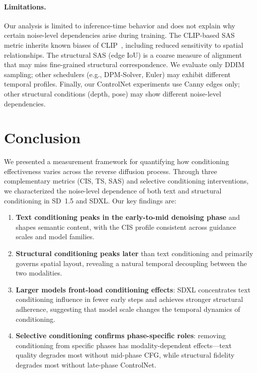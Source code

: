 \documentclass{article}
\begin{document}
\paragraph{Limitations.}
Our analysis is limited to inference-time behavior and does not explain why certain noise-level dependencies arise during training. The CLIP-based SAS metric inherits known biases of CLIP~\citep{radford2021learning}, including reduced sensitivity to spatial relationships. The structural SAS (edge IoU) is a coarse measure of alignment that may miss fine-grained structural correspondence. We evaluate only DDIM sampling; other schedulers (e.g., DPM-Solver, Euler) may exhibit different temporal profiles. Finally, our ControlNet experiments use Canny edges only; other structural conditions (depth, pose) may show different noise-level dependencies.

\section{Conclusion}
\label{sec:conclusion}

We presented a measurement framework for quantifying how conditioning effectiveness varies across the reverse diffusion process. Through three complementary metrics (CIS, TS, SAS) and selective conditioning interventions, we characterized the noise-level dependence of both text and structural conditioning in SD~1.5 and SDXL. Our key findings are:

\begin{enumerate}[nosep, leftmargin=*]
    \item \textbf{Text conditioning peaks in the early-to-mid denoising phase} and shapes semantic content, with the CIS profile consistent across guidance scales and model families.
    \item \textbf{Structural conditioning peaks later} than text conditioning and primarily governs spatial layout, revealing a natural temporal decoupling between the two modalities.
    \item \textbf{Larger models front-load conditioning effects}: SDXL concentrates text conditioning influence in fewer early steps and achieves stronger structural adherence, suggesting that model scale changes the temporal dynamics of conditioning.
    \item \textbf{Selective conditioning confirms phase-specific roles}: removing conditioning from specific phases has modality-dependent effects---text quality degrades most without mid-phase CFG, while structural fidelity degrades most without late-phase ControlNet.
\end{enumerate}
\end{document}
